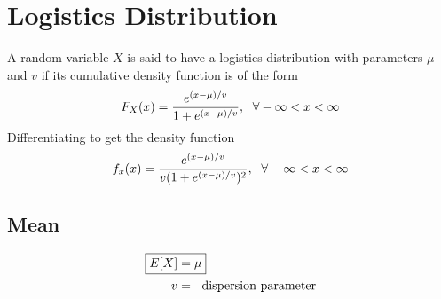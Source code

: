 \documentclass[../probability-notes.tex]{subfiles}
\begin{document}
    \section{Logistics Distribution}
    A random variable $X$ is said to have a logistics distribution with parameters $\mu$ and $v$ if its cumulative density function is of the form
    \begin{align*}
        F_{X}(x) = \frac{e^{(x-\mu)/ v}}{1 + e^{(x-\mu)/ v}}, \text{\; $\forall - \infty < x < \infty$}
    \end{align*}
    Differentiating to get the density function
    \begin{align*}
        f_{x}(x) = \frac{e^{(x-\mu)/v}}{v(1 + e^{(x-\mu)/v})^{2}}, \text{\; $\forall -\infty < x < \infty$}
    \end{align*}

    \subsection{Mean}
    \begin{align*}
        \Aboxed{E[X] &= \mu}\\
        v &= \text{\; dispersion parameter}
    \end{align*}
\end{document}
